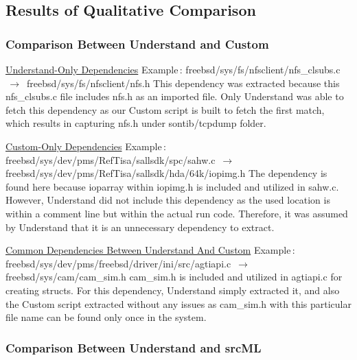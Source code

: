 \documentclass[12pt, dvipsnames, a4paper]{article}
\begin{document}
\subsection{Results of Qualitative Comparison}
\subsubsection{Comparison Between Understand and Custom}
\underline{Understand-Only Dependencies}
\newline
\newline
Example$\,\colon\,$freebsd/sys/fs/nfsclient/nfs\_clsubs.c $\,\to\,$ freebsd/sys/fs/nfsclient/nfs.h
\newline
\newline
This dependency was extracted because this nfs\_clsubs.c file includes nfs.h as an imported file. Only Understand was able to fetch this dependency as our Custom script is built to fetch the first match, which results in capturing nfs.h under sontib/tcpdump folder.

\underline{Custom-Only Dependencies}
\newline
\newline
Example$\,\colon\,$freebsd/sys/dev/pms/RefTisa/sallsdk/spc/sahw.c $\,\to\,$ freebsd/sys/dev/pms/RefTisa/sallsdk/hda/64k/iopimg.h
\newline
\newline
The dependency is found here because ioparray within iopimg.h is included and utilized in sahw.c.
However, Understand did not include this dependency as the used location is within a comment line but within the actual run code. Therefore, it was assumed by Understand that it is an unnecessary dependency to extract.

\underline{Common Dependencies Between Understand And Custom}
\newline
\newline
Example$\,\colon\,$freebsd/sys/dev/pms/freebsd/driver/ini/src/agtiapi.c $\,\to\,$ freebsd/sys/cam/cam\_sim.h
\newline
\newline
cam\_sim.h is included and utilized in agtiapi.c for creating structs. For this dependency, Understand simply extracted it, and also the Custom script extracted without any issues as cam\_sim.h with this particular file name can be found only once in the system.

\subsubsection{Comparison Between Understand and srcML}
\end{document}
